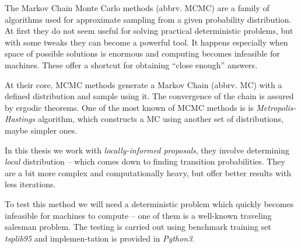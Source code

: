 The Markov Chain Monte Carlo methods (abbrv. MCMC) are a family of algorithms used for approximate sampling from a given probability distribution. At first they do not seem useful for solving practical deterministic problems, but with some tweaks they can become a powerful tool. It happens especially when space of possible solutions is enormous and computing becomes infeasible for machines. These offer a shortcut for obtaining ``close enough'' answers.
		
At their core, MCMC methods generate a Markov Chain (abbrv. MC) with a defined distribution and sample using it. The convergence of the chain is assured by ergodic theorems. One of the most known of MCMC methods is is \textit{Metropolis-Hastings} algorithm, which constructs a MC using another set of distributions, maybe simpler ones.

In this thesis we work with \textit{locally-informed proposals}, they involve determining \textit{local} distribution -- which comes down to finding transition probabilities. They are a bit more complex and computationally heavy, but offer better results with less iterations. 

To test this method we will need a deterministic problem which quickly becomes infeasible for machines to compute -- one of them is a well-known traveling salesman problem. The testing is carried out using benchmark training set \textit{tsplib95} and implemen-tation is provided in \textit{Python3}.